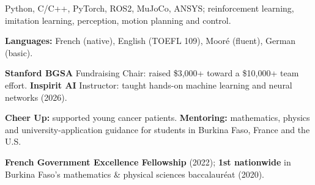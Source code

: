 \documentclass[10pt,letterpaper]{article}
\begin{document}
Python, C/C++, PyTorch, ROS2, MuJoCo, ANSYS; reinforcement learning, imitation learning, perception, motion planning and control.\par
\textbf{Languages:} French (native), English (TOEFL 109), Mooré (fluent), German (basic).\par
{}\par\vspace{1pt}{\color{navy!40}\hrule}\vspace{2pt}
\textbf{Stanford BGSA} Fundraising Chair: raised \$3,000+ toward a \$10,000+ team effort. \textbf{Inspirit AI} Instructor: taught hands-on machine learning and neural networks (2026).\par
\textbf{Cheer Up:} supported young cancer patients. \textbf{Mentoring:} mathematics, physics and university-application guidance for students in Burkina Faso, France and the U.S.\par
\textbf{French Government Excellence Fellowship} (2022); \textbf{1st nationwide} in Burkina Faso's mathematics \& physical sciences baccalauréat (2020).\par
\end{document}
